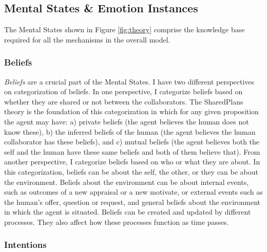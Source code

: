 \subsection{Mental States \& Emotion Instances}

The Mental States shown in Figure \ref{fig:theory} comprise the knowledge base
required for all the mechanisms in the overall model.

\subsubsection{Beliefs}

\textit{Beliefs} are a crucial part of the Mental States. I have two different
perspectives on categorization of beliefs. In one perspective, I categorize
beliefs based on whether they are shared or not between the collaborators. The
SharedPlans \cite{grosz:plans-discourse} theory is the foundation of this
categorization in which for any given proposition the agent may have: a) private
beliefs (the agent believes the human does not know these), b) the inferred
beliefs of the human (the agent believes the human collaborator has these
beliefs), and c) mutual beliefs (the agent believes both the self and the human
have these same beliefs and both of them believe that). From another
perspective, I categorize beliefs based on who or what they are about. In this
categorization, beliefs can be about the self, the other, or they can be about
the environment. Beliefs about the environment can be about internal events,
such as outcomes of a new appraisal or a new motivate, or external events such
as the human's offer, question or request, and general beliefs about the
environment in which the agent is situated. Beliefs can be created and updated
by different processes. They also affect how these processes function as time
passes.

\subsubsection{Intentions}

